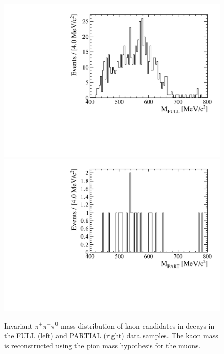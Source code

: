 \begin{figure} [htb!]
\begin{center}
\includegraphics[scale=0.30]{figs/M_VC_pipi_hyp.pdf}
\includegraphics[scale=0.30]{figs/M_V0_pipi_hyp.pdf}
\caption{Invariant $\pi^{+}\pi^{-}\pi^0$ mass distribution of kaon candidates in decays in the FULL (left) and PARTIAL (right) data samples. The kaon mass is reconstructed using the pion mass hypothesis for the muons. \label{fig:eta_bkg}}
\end{center}
\end{figure}


